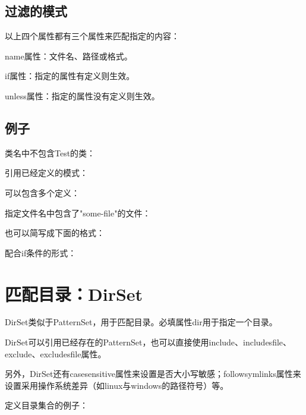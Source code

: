	\subsection{过滤的模式}

		以上四个属性都有三个属性来匹配指定的内容：

		name属性：文件名、路径或格式。

		if属性：指定的属性有定义则生效。

		unless属性：指定的属性没有定义则生效。


	\subsection{例子}

		类名中不包含Test的类：

		

		引用已经定义的模式：

		

		可以包含多个定义：

		

		指定文件名中包含了"some-file"的文件：

		

		也可以简写成下面的格式：

		

		配合if条件的形式：

		

\section{匹配目录：DirSet}

	DirSet类似于PatternSet，用于匹配目录。必填属性dir用于指定一个目录。
	
	DirSet可以引用已经存在的PatternSet，也可以直接使用include、includesfile、exclude、excludesfile属性。

	另外，DirSet还有casesensitive属性来设置是否大小写敏感；followsymlinks属性来设置采用操作系统差异（如linux与windows的路径符号）等。

	定义目录集合的例子：

